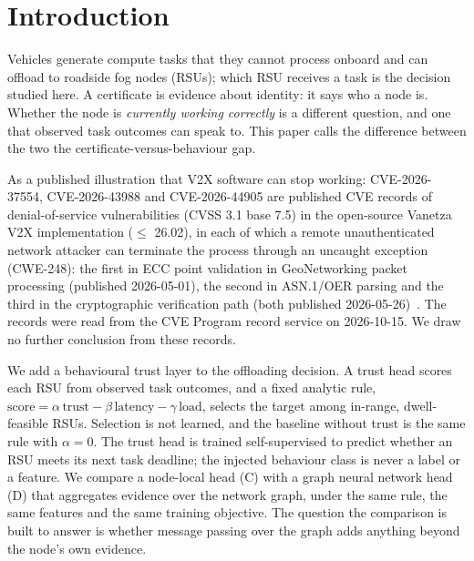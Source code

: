 \section{Introduction}
\label{sec:intro}

Vehicles generate compute tasks that they cannot process onboard and can offload to roadside fog nodes (RSUs); which RSU receives a task is the decision studied here.
A certificate is evidence about identity: it says who a node is.
Whether the node is \emph{currently working correctly} is a different question, and one that observed task outcomes can speak to.
This paper calls the difference between the two the certificate-versus-behaviour gap.

As a published illustration that V2X software can stop working:
CVE-2026-37554, CVE-2026-43988 and CVE-2026-44905 are published CVE records of denial-of-service vulnerabilities (CVSS 3.1 base 7.5) in the open-source Vanetza V2X implementation ($\le$ 26.02), in each of which a remote unauthenticated network attacker can terminate the process through an uncaught exception (CWE-248): the first in ECC point validation in GeoNetworking packet processing (published 2026-05-01), the second in ASN.1/OER parsing and the third in the cryptographic verification path (both published 2026-05-26)~\cite{cve1,cve2,cve3}.
The records were read from the CVE Program record service on 2026-10-15.
We draw no further conclusion from these records.

We add a behavioural trust layer to the offloading decision.
A trust head scores each RSU from observed task outcomes, and a fixed analytic rule, $\text{score}=\alpha\,\text{trust}-\beta\,\text{latency}-\gamma\,\text{load}$, selects the target among in-range, dwell-feasible RSUs.
Selection is not learned, and the baseline without trust is the same rule with $\alpha=0$.
The trust head is trained self-supervised to predict whether an RSU meets its next task deadline; the injected behaviour class is never a label or a feature.
We compare a node-local head (C) with a graph neural network head (D) that aggregates evidence over the network graph, under the same rule, the same features and the same training objective.
The question the comparison is built to answer is whether message passing over the graph adds anything beyond the node's own evidence.

